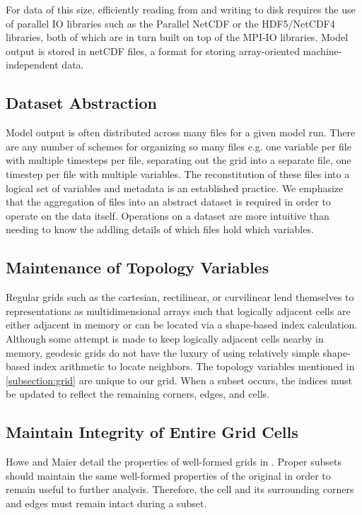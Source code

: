 For data of this size, efficiently reading from and writing to disk requires
the use of parallel IO libraries such as the Parallel NetCDF\cite{PNETCDF} or
the HDF5/NetCDF4\cite{HDF5}\cite{NETCDF} libraries, both of which are in turn
built on top of the MPI-IO libraries\cite{MPIIO}.  Model output is stored in
netCDF\cite{NETCDF} files, a format for storing array-oriented
machine-independent data.

\subsection{Dataset Abstraction}

Model output is often distributed across many files for a given model run.
There are any number of schemes for organizing so many files e.g. one variable
per file with multiple timesteps per file, separating out the grid into a
separate file, one timestep per file with multiple variables.  The
reconstitution of these files into a logical set of variables and metadata is
an established practice.\cite{NcML}\cite{THREDDS}  We emphasize that the
aggregation of files into an abstract dataset is required in order to operate
on the data itself.  Operations on a dataset are more intuitive than needing
to know the addling details of which files hold which variables.

\subsection{Maintenance of Topology Variables}

Regular grids such as the cartesian, rectilinear, or curvilinear lend
themselves to representations as multidimensional arrays such that logically
adjacent cells are either adjacent in memory or can be located via a
shape-based index calculation.  Although some attempt is made to keep
logically adjacent cells nearby in memory, geodesic grids do not have the
luxury of using relatively simple shape-based index arithmetic to locate
neighbors.  The topology variables mentioned in \ref{subsection:grid} are
unique to our grid.  When a subset occurs, the indices must be updated to
reflect the remaining corners, edges, and cells.

\subsection{Maintain Integrity of Entire Grid Cells}

Howe and Maier detail the properties of well-formed grids in \cite{UGRID}.
Proper subsets should maintain the same well-formed properties of the original
in order to remain useful to further analysis.  Therefore, the cell and its
surrounding corners and edges must remain intact during a subset.
